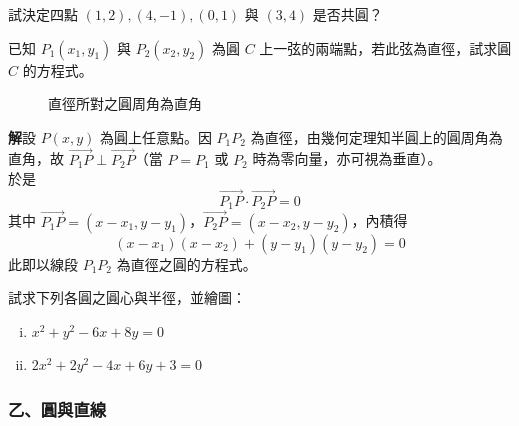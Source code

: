 \begin{exercise}
試決定四點 $(1,2), (4,-1), (0,1)$ 與 $(3,4)$ 是否共圓？
\end{exercise}

\begin{example}
已知 $P_1(x_1, y_1)$ 與 $P_2(x_2, y_2)$ 為圓 $C$ 上一弦的兩端點，若此弦為直徑，試求圓 $C$ 的方程式。

\begin{figure}[htbp]
\centering
{}
\caption{直徑所對之圓周角為直角}
\label{fig:b4s-3-34}
\end{figure}

\textbf{解}\quad 設 $P(x,y)$ 為圓上任意點。因 $P_1P_2$ 為直徑，由幾何定理知半圓上的圓周角為直角，故 $\vec{P_1P} \perp \vec{P_2P}$（當 $P=P_1$ 或 $P_2$ 時為零向量，亦可視為垂直）。\\
於是
\[ \vec{P_1P} \cdot \vec{P_2P} = 0 \]
其中 $\vec{P_1P} = (x - x_1, y - y_1)$，$\vec{P_2P} = (x - x_2, y - y_2)$，內積得
\[ (x - x_1)(x - x_2) + (y - y_1)(y - y_2) = 0 \]
此即以線段 $P_1P_2$ 為直徑之圓的方程式。
\end{example}

\begin{exercise}
試求下列各圓之圓心與半徑，並繪圖：
\begin{enumerate}[(i)]
  \item $x^2 + y^2 - 6x + 8y = 0$
  \item $2x^2 + 2y^2 - 4x + 6y + 3 = 0$
\end{enumerate}
\end{exercise}

\subsubsection*{乙、圓與直線}


